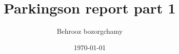 \documentclass[twocolumn, 9pt]{extarticle}
\begin{document}
\title{Parkingson report part 1}

\author[1, 2]{Behrooz bozorgchamy}


\setcounter{Maxaffil}{0}
\renewcommand\Affilfont{\itshape\small}

\date{\today}  
\maketitle








\end{document}
